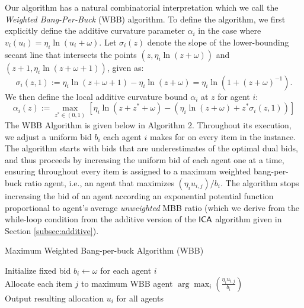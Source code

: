 Our algorithm has a natural combinatorial interpretation  which we call the {\em Weighted Bang-Per-Buck} (WBB) algorithm. To define the algorithm, we first explicitly define the additive curvature parameter $\alpha_i$ in the case where $v_i(u_i) = \eta_i \ln(u_i + \omega)$. Let $\sigma_i(z)$ denote the slope of the lower-bounding secant line that intersects the points $(z, \eta_i\ln(z + \omega))$ and $(z+1, \eta_i\ln(z+\omega + 1))$, given as:
\begin{equation}
\label{eq:sn-slope}
\sigma_{i}(z,1) := \eta_i\ln(z+ \omega + 1) - \eta_i\ln(z+\omega) =\eta_i\ln\left(1 + (z+\omega)^{-1}\right).
\end{equation} 
We then define the local additive curvature bound $\alpha_i$ at $z$ for agent $i$:
\begin{equation}
\label{eq:sn-curv}
\alpha_i(z) := \max_{z^* \in (0, 1)} \left[\eta_i\ln(z + z^* + \omega) - (\eta_i\ln(z + \omega) + z^*\sigma_{i}(z,1))\right]
\end{equation}
The  WBB Algorithm is given below in Algorithm 2.  
Throughout its execution, we adjust a uniform bid $b_i$ each agent $i$ makes for on every item in the instance. The algorithm starts with bids that are underestimates of the optimal dual bids, and thus proceeds by increasing the uniform bid of each agent one at a time, ensuring throughout every item is assigned to a maximum weighted bang-per-buck ratio agent, i.e., an agent that maximizes $(\eta_i u_{i,j})/b_i$. 
The algorithm stops increasing the bid of an agent according an exponential potential function proportional to agent's average {\em unweighted} MBB ratio (which we derive from the while-loop condition from the additive version of the $\mathsf{ICA}$ algorithm given in Section \ref{subsec:additive}).


\begin{algorithm}

\caption{Maximum Weighted Bang-per-buck Algorithm ({\sc WBB})}
Initialize fixed bid $b_i \leftarrow \omega$ for each agent $i$  \\
 \label{alg:WMBB}
Allocate each item $j$ to maximum WBB agent $\arg\max_{i} \left( \frac{ \eta_i u_{i,j}}{b_i} \right)$  \\
Output resulting allocation $u_i$ for all agents
\end{algorithm}






